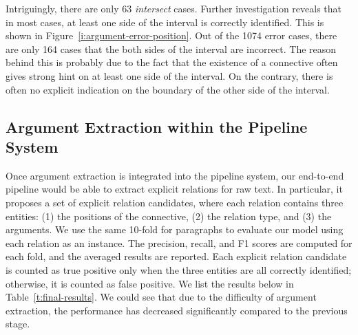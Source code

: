 

Intriguingly, there are only 63 \textit{intersect} cases. Further investigation
reveals that in most cases, at least one side of the interval is correctly
identified. This is shown in Figure~\ref{i:argument-error-position}. Out of
the 1074 error cases, there are only 164 cases that the both sides of the
interval are incorrect. The reason behind this is probably due to the fact that
the existence of a connective often gives strong hint on at least one side of
the interval. On the contrary, there is often no explicit indication on the boundary
of the other side of the interval.



\subsection{Argument Extraction within the Pipeline System}

Once argument extraction is integrated into the pipeline system, our end-to-end
pipeline would be able to extract explicit relations for raw text. In particular,
it proposes a set of explicit relation candidates, where each relation contains
three entities: (1) the positions of the connective, (2) the relation type, and
(3) the arguments. We use the same 10-fold for paragraphs to evaluate our model
using each relation
as an instance. The precision, recall, and F1 scores are computed for each fold,
and the averaged results are reported. Each explicit relation candidate is
counted as true positive only when the three entities are all correctly
identified; otherwise, it is counted as false positive. We list the results
below in Table~\ref{t:final-results}. We could see that due to the difficulty
of argument extraction, the performance has decreased significantly compared
to the previous stage.


